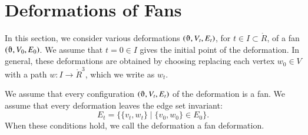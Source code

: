 %
%
%
%

\section{Deformations of Fans}

In this section, we consider various deformations $(\orgn,V_t,E_t)$,
for $t\in I\subset \ring{R}$, of
a fan $(\orgn,V_0,E_0)$.  
We assume that $t=0\in I$ gives the initial point
of the deformation.  
In general, these deformations
are obtained by choosing replacing each vertex $w_0\in V$
with a path $w:I\to \ring{R}^3$, which we write as $w_t$.  


We assume that every configuration $(\orgn,V_t,E_t)$ of the 
deformation is a fan.
We assume that every deformation
leaves the edge set invariant:
   \begin{equation}\label{eqn:edge}
   E_t = \{ \{v_t,w_t\} \mid \{v_0,w_0\}\in E_0\}.
   \end{equation}
When these conditions hold, we call the deformation a 
fan deformation.

